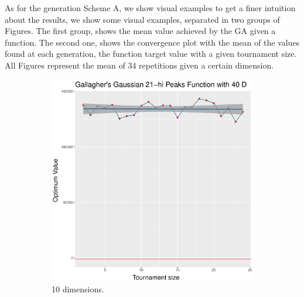 As for the generation Scheme A, we show visual examples to get a finer intuition about the results, we show  some visual examples, separated in two groups of Figures. The first group, shows the mean value achieved by the GA given a function. The second one, shows the convergence plot with the mean of the values found at each generation, the function target value with a given tournament size. All Figures represent the mean of 34 repetitions given a certain dimension.


\begin{figure}[t]
	\begin{subfigure}[b]{0.33\textwidth}
		\centering
		\includegraphics[width=\textwidth]{img/multimodal_2n2n_22_dim_40.pdf}
		\caption{10 dimensions.}
	\end{subfigure}
	\begin{subfigure}[b]{0.33\textwidth}
		\centering

\end{subfigure}
\end{figure}
